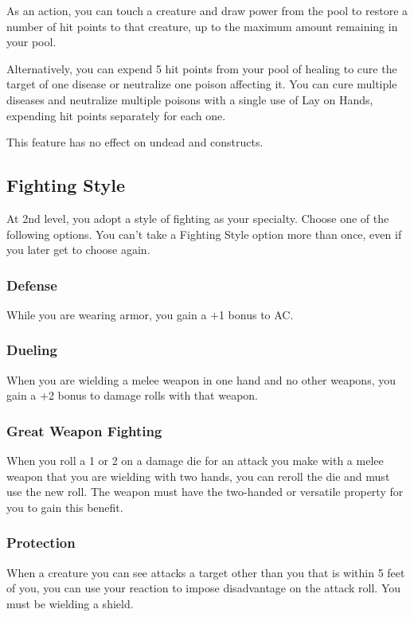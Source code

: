 As an action, you can touch a creature and draw power from the pool to restore a number of hit points to that creature, up to the maximum amount remaining in your pool.

Alternatively, you can expend 5 hit points from your pool of healing to cure the target of one disease or neutralize one poison affecting it. You can cure multiple diseases and neutralize multiple poisons with a single use of Lay on Hands, expending hit points separately for each one.

This feature has no effect on undead and constructs.

\subsection{Fighting Style}

At 2nd level, you adopt a style of fighting as your specialty. Choose one of the following options. You can’t take a Fighting Style option more than once, even if you later get to choose again.

\subsubsection{Defense}

While you are wearing armor, you gain a +1 bonus to AC.

\subsubsection{Dueling}

When you are wielding a melee weapon in one hand and no other weapons, you gain a +2 bonus to damage rolls with that weapon.

\subsubsection{Great Weapon Fighting}

When you roll a 1 or 2 on a damage die for an attack you make with a melee weapon that you are wielding with two hands, you can reroll the die and must use the new roll. The weapon must have the two-handed or versatile property for you to gain this benefit.

\subsubsection{Protection}

When a creature you can see attacks a target other than you that is within 5 feet of you, you can use your reaction to impose disadvantage on the attack roll. You must be wielding a shield.

